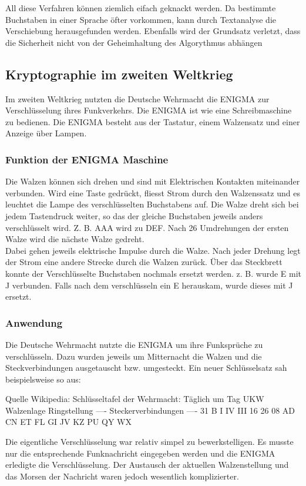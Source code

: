 All diese Verfahren können ziemlich eifach geknackt werden. Da bestimmte Buchstaben in einer Sprache öfter vorkommen, kann durch Textanalyse die Verschiebung herausgefunden werden. Ebenfalls wird der Grundsatz verletzt, dass die Sicherheit nicht von der Geheimhaltung
des Algorythmus abhängen 

\subsection{Kryptographie im zweiten Weltkrieg}
Im zweiten Weltkrieg nutzten die Deutsche Wehrmacht die ENIGMA zur Verschlüsselung ihres Funkverkehrs. Die ENIGMA ist wie eine Schreibmaschine zu bedienen. Die ENIGMA besteht aus der Tastatur, einem Walzensatz und einer Anzeige über Lampen. 

\subsubsection{Funktion der ENIGMA Maschine}
Die Walzen können sich drehen und sind mit Elektrischen Kontakten miteinander verbunden. Wird eine Taste gedrückt, fliesst Strom durch den Walzenssatz und es leuchtet die Lampe des verschlüsselten Buchstabens auf. Die Walze dreht sich bei jedem Tastendruck weiter, so das der gleiche Buchstaben jeweils anders verschlüsselt wird. Z. B. AAA wird zu DEF. Nach 26 Umdrehungen der ersten Walze wird die nächste Walze gedreht. \\
Dabei gehen jeweils elektrische Impulse durch die Walze. Nach jeder Drehung legt der Strom eine andere Strecke durch die Walzen zurück. 
Über das Steckbrett konnte der Verschlüsselte Buchstaben nochmals ersetzt werden. z. B. wurde E mit J verbunden. Falls nach dem verschlüsseln ein E herauskam, wurde dieses mit J ersetzt. 

\subsubsection{Anwendung}
Die Deutsche Wehrmacht nutzte die ENIGMA um ihre Funksprüche zu verschlüsseln. Dazu wurden jeweils um Mitternacht die Walzen und die Steckverbindungen ausgetauscht bzw. umgesteckt. Ein neuer Schlüsselsatz sah beispielsweise so aus:

Quelle Wikipedia: Schlüsseltafel der Wehrmacht: Täglich um 
Tag UKW  Walzenlage  Ringstellung  ---- Steckerverbindungen ----
 31  B   I   IV III    16 26 08    AD CN ET FL GI JV KZ PU QY WX 

Die eigentliche Verschlüsselung war relativ simpel zu bewerkstelligen. Es musste nur die entsprechende Funknachricht eingegeben werden und die ENIGMA erledigte die Verschlüsselung. Der Austausch der aktuellen Walzenstellung und das Morsen der Nachricht waren jedoch wesentlich komplizierter.

